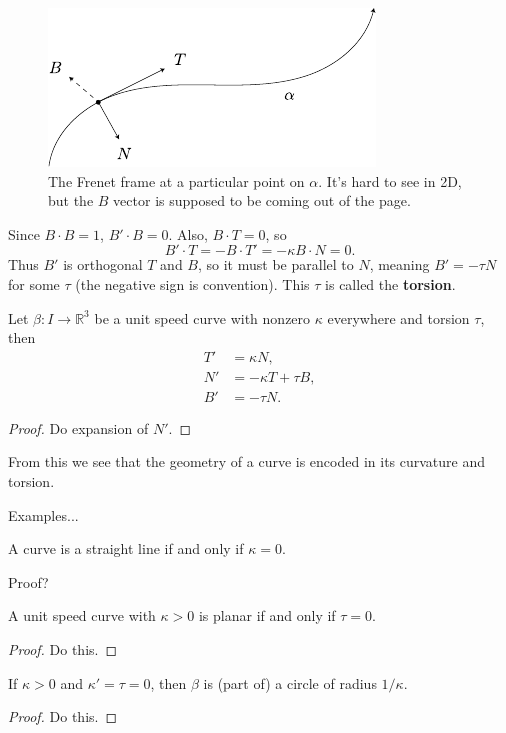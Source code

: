 \documentclass[10pt]{report}
\begin{document}
\begin{figure}[H]
	\centering
	\includegraphics[scale=1.5]{fig/frenet.pdf}
	\caption{The Frenet frame at a particular point on $\alpha$. It's hard to see in 2D, but the $B$ vector is supposed to be coming out of the page.}
\end{figure}

Since $B \cdot B=1$, $B' \cdot B = 0$. Also, $B \cdot T = 0$, so
	\[
	B' \cdot T = -B \cdot T' = -\kappa B \cdot N = 0.
	\]
	Thus $B'$ is orthogonal $T$ and $B$, so it must be parallel to $N$, meaning $B' = -\tau N$ for some $\tau$ (the negative sign is convention). This $\tau$ is called the \textbf{torsion}.

\begin{thrm}
Let $\beta:I \to \mathbb{R}^3$ be a unit speed curve with nonzero $\kappa$ everywhere and torsion $\tau$, then
\begin{align*}
	T' &= \kappa N, \\
	N' &= -\kappa T + \tau B, \\
	B' &= -\tau N.
\end{align*}
\end{thrm}
\begin{proof}
	{\color{red}Do expansion of $N'$.}
\end{proof}

From this we see that the geometry of a curve is encoded in its curvature and torsion.

{\color{red}Examples...}

\begin{prop}
A curve is a straight line if and only if $\kappa=0$.
\end{prop}
{\color{red}Proof?}

\begin{prop}
 	A unit speed curve with $\kappa>0$ is planar if and only if $\tau = 0$.
\end{prop}
\begin{proof}
	{\color{red}Do this.}
\end{proof}

\begin{lem}
	If $\kappa>0$ and $\kappa'=\tau=0$, then $\beta$ is (part of) a circle of radius $1/\kappa$.
\end{lem}
\begin{proof}
	{\color{red}Do this.}
\end{proof}
\end{document}
